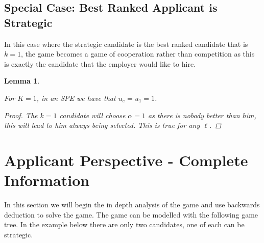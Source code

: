 \documentclass{article}
\newtheorem{lemma}{Lemma}
\begin{document}
\subsection{Special Case: Best Ranked Applicant is Strategic}

In this case where the strategic candidate is the best ranked candidate that is $k=1$, the game becomes a game of cooperation rather than competition as this is exactly the candidate that the employer would like to hire.

\begin{lemma}\label{lemma:best_strategic}

For $K=1$, in an SPE we have that $u_e=u_1=1$.
\begin{proof}
The $k=1$ candidate will choose $\alpha=1$ as there is nobody better than him, this will lead to him always being selected. This is true for any $\ell$. 
\end{proof}
\end{lemma}

\section{Applicant Perspective - Complete Information}

In this section we will begin the in depth analysis of the game and use backwards deduction to solve the game. The game can be modelled with the following game tree. In the example below there are only two candidates, one of each can be strategic.
\end{document}

